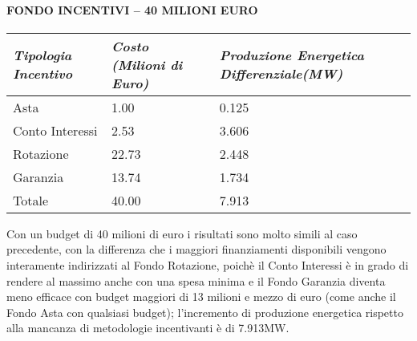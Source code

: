 \documentclass[12pt,a4paper,openright,twoside]{report}
\begin{document}
\paragraph{FONDO INCENTIVI – 40 MILIONI EURO}
\begin{center}
	\begin{tabular}{ | p{4.5cm}  | p{4.5cm} | p{4.5cm} | }
		\hline
		\nohyphens{\emph{Tipologia Incentivo}} & \nohyphens{\emph{Costo (Milioni di Euro)}} & \nohyphens{\emph{Produzione Energetica Differenziale(MW)}} \\ \hline
		Asta &  1.00 & 0.125 \\ \hline
		Conto Interessi & 2.53 & 3.606 \\ \hline
		Rotazione & 22.73 & 2.448 \\ \hline
		Garanzia & 13.74 & 1.734 \\ \hline \hline 
		Totale & 40.00 & 7.913 \\
		\hline
	\end{tabular}
\end{center}
Con un budget di 40 milioni di euro i risultati sono molto simili al caso precedente, con la differenza che i maggiori finanziamenti disponibili vengono interamente indirizzati al Fondo Rotazione, poichè il Conto Interessi è in grado di rendere al massimo anche con una spesa minima e il Fondo Garanzia diventa meno efficace con budget maggiori di 13 milioni e mezzo di euro (come anche il Fondo Asta con qualsiasi budget); l'incremento di produzione energetica rispetto alla mancanza di metodologie incentivanti è di 7.913MW.
\end{document}

